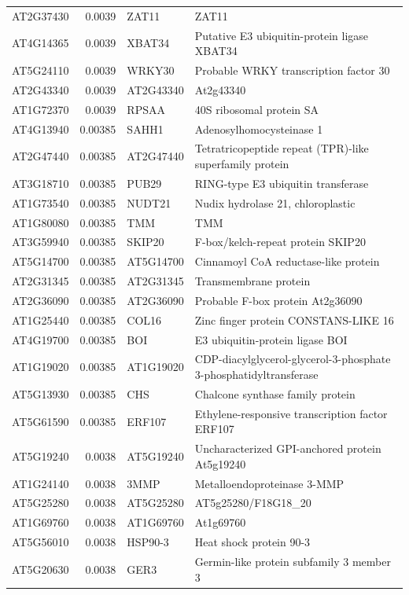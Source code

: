 \documentclass[11pt]{article}
\begin{document}
\begin{center}
\begin{tabular}{lrll}
AT2G37430 & 0.0039 & ZAT11 & ZAT11\\
AT4G14365 & 0.0039 & XBAT34 & Putative E3 ubiquitin-protein ligase XBAT34\\
AT5G24110 & 0.0039 & WRKY30 & Probable WRKY transcription factor 30\\
AT2G43340 & 0.0039 & AT2G43340 & At2g43340\\
AT1G72370 & 0.0039 & RPSAA & 40S ribosomal protein SA\\
AT4G13940 & 0.00385 & SAHH1 & Adenosylhomocysteinase 1\\
AT2G47440 & 0.00385 & AT2G47440 & Tetratricopeptide repeat (TPR)-like superfamily protein\\
AT3G18710 & 0.00385 & PUB29 & RING-type E3 ubiquitin transferase\\
AT1G73540 & 0.00385 & NUDT21 & Nudix hydrolase 21, chloroplastic\\
AT1G80080 & 0.00385 & TMM & TMM\\
AT3G59940 & 0.00385 & SKIP20 & F-box/kelch-repeat protein SKIP20\\
AT5G14700 & 0.00385 & AT5G14700 & Cinnamoyl CoA reductase-like protein\\
AT2G31345 & 0.00385 & AT2G31345 & Transmembrane protein\\
AT2G36090 & 0.00385 & AT2G36090 & Probable F-box protein At2g36090\\
AT1G25440 & 0.00385 & COL16 & Zinc finger protein CONSTANS-LIKE 16\\
AT4G19700 & 0.00385 & BOI & E3 ubiquitin-protein ligase BOI\\
AT1G19020 & 0.00385 & AT1G19020 & CDP-diacylglycerol-glycerol-3-phosphate 3-phosphatidyltransferase\\
AT5G13930 & 0.00385 & CHS & Chalcone synthase family protein\\
AT5G61590 & 0.00385 & ERF107 & Ethylene-responsive transcription factor ERF107\\
AT5G19240 & 0.0038 & AT5G19240 & Uncharacterized GPI-anchored protein At5g19240\\
AT1G24140 & 0.0038 & 3MMP & Metalloendoproteinase 3-MMP\\
AT5G25280 & 0.0038 & AT5G25280 & AT5g25280/F18G18\_20\\
AT1G69760 & 0.0038 & AT1G69760 & At1g69760\\
AT5G56010 & 0.0038 & HSP90-3 & Heat shock protein 90-3\\
AT5G20630 & 0.0038 & GER3 & Germin-like protein subfamily 3 member 3\\

\end{tabular}
\end{center}
\end{document}
